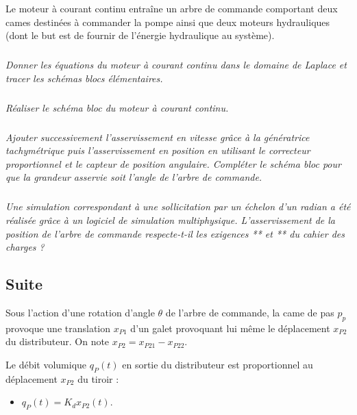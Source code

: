 \documentclass[10pt,fleqn]{article} %
\begin{document}
\begin{multicols}{2}
Le moteur à courant continu entraîne un arbre de commande comportant deux cames destinées à commander la pompe ainsi que deux moteurs hydrauliques (dont le but est de fournir de l'énergie hydraulique au système). 


\subparagraph{}
\textit{Donner les équations du moteur à courant continu dans le domaine de Laplace et tracer les schémas blocs élémentaires.}
\begin{corrige}

\end{corrige}

\subparagraph{}
\textit{Réaliser le schéma bloc du moteur à courant continu.}
\begin{corrige}

\end{corrige}

\subparagraph{}
\textit{Ajouter successivement l'asservissement en vitesse grâce à la génératrice tachymétrique puis l'asservissement en position en utilisant le correcteur proportionnel et le capteur de position angulaire. Compléter le schéma bloc pour que la grandeur asservie soit l'angle de l'arbre de commande.}
\begin{corrige}

\end{corrige}

\subparagraph{}
\textit{Une simulation correspondant à une sollicitation par un échelon d'un radian a été réalisée grâce à un logiciel de simulation multiphysique. L'asservissement de la position de l'arbre de commande respecte-t-il les exigences ** et ** du cahier des charges ?}
\begin{corrige}

\end{corrige}


\subsection*{Suite}

Sous l'action d'une rotation d'angle $\theta$ de l'arbre de commande, la came de pas $p_p$ provoque une translation $x_{P1}$ d'un galet provoquant lui même le déplacement $x_{P2}$ du distributeur. On note $x_{P2}=x_{P21}-x_{P22}$.

Le débit volumique $q_P(t)$ en sortie du distributeur est proportionnel au déplacement $x_{P2}$ du tiroir : 
\begin{itemize}
\item $q_P(t)=K_d x_{P2}(t)$.
\end{itemize}


\end{multicols}
\end{document}
